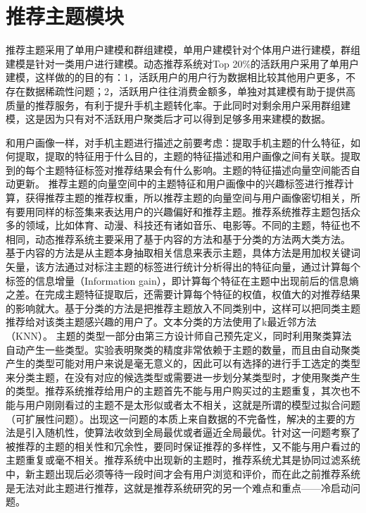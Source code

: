   \section{推荐主题模块}
  推荐主题采用了单用户建模和群组建模，单用户建模针对个体用户进行建模，群组建模是针对一类用户进行建模。动态推荐系统对Top 20\%的活跃用户采用了单用户建模，这样做的的目的有：1，活跃用户的用户行为数据相比较其他用户更多，不存在数据稀疏性问题；2，活跃用户往往消费金额多，单独对其建模有助于提供高质量的推荐服务，有利于提升手机主题转化率。于此同时对剩余用户采用群组建模，这是因为只有对不活跃用户聚类后才可以得到足够多用来建模的数据。

  和用户画像一样，对手机主题进行描述之前要考虑：提取手机主题的什么特征，如何提取，提取的特征用于什么目的，主题的特征描述和用户画像之间有关联。提取到的每个主题特征标签对推荐结果会有什么影响。主题的特征描述向量空间能否自动更新。
  推荐主题的向量空间中的主题特征和用户画像中的兴趣标签进行推荐计算，获得推荐主题的推荐权重，所以推荐主题的向量空间与用户画像密切相关，所有要用同样的标签集来表达用户的兴趣偏好和推荐主题。推荐系统推荐主题包括众多的领域，比如体育、动漫、科技还有诸如音乐、电影等。不同的主题，特征也不相同，动态推荐系统主要采用了基于内容的方法和基于分类的方法两大类方法。 基于内容的方法是从主题本身抽取相关信息来表示主题，具体方法是用加权关键词矢量，该方法通过对标注主题的标签进行统计分析得出的特征向量，通过计算每个标签的信息增量（Information gain），即计算每个特征在主题中出现前后的信息熵之差。在完成主题特征提取后，还需要计算每个特征的权值，权值大的对推荐结果的影响就大。基于分类的方法是把推荐主题放入不同类别中，这样可以把同类主题推荐给对该类主题感兴趣的用户了。文本分类的方法使用了k最近邻方法（KNN）。 主题的类型一部分由第三方设计师自己预先定义，同时利用聚类算法自动产生一些类型。实验表明聚类的精度非常依赖于主题的数量，而且由自动聚类产生的类型可能对用户来说是毫无意义的，因此可以有选择的进行手工选定的类型来分类主题，在没有对应的候选类型或需要进一步划分某类型时，才使用聚类产生的类型。推荐系统推荐给用户的主题首先不能与用户购买过的主题重复，其次也不能与用户刚刚看过的主题不是太形似或者太不相关，这就是所谓的模型过拟合问题（可扩展性问题）。出现这一问题的本质上来自数据的不完备性，解决的主要的方法是引入随机性，使算法收敛到全局最优或者逼近全局最优。针对这一问题考察了被推荐的主题的相关性和冗余性，要同时保证推荐的多样性，又不能与用户看过的主题重复或毫不相关。推荐系统中出现新的主题时，推荐系统尤其是协同过滤系统中，新主题出现后必须等待一段时间才会有用户浏览和评价，而在此之前推荐系统是无法对此主题进行推荐，这就是推荐系统研究的另一个难点和重点——冷启动问题。
  
